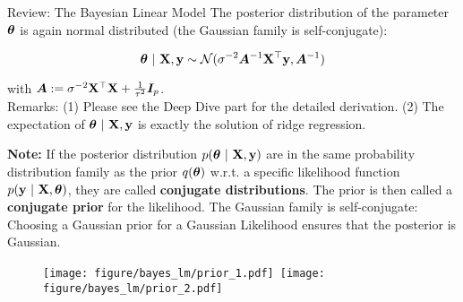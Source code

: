 \documentclass[11pt,compress,t,notes=noshow, xcolor=table]{beamer}
\begin{document}
\begin{vbframe}{Review: The Bayesian Linear Model}
    The posterior distribution of the parameter $\bm{\theta}$ is again normal distributed (the Gaussian family is self-conjugate): 

    $$
    \bm{\theta} ~|~ \mathbf{X}, \mathbf{y} \sim \mathcal{N}(\sigma^{-2}\bm{A}^{-1}\mathbf{X}^\top\mathbf{y}, \bm{A}^{-1})
    $$

    with $\bm{A}:= \sigma^{-2}\mathbf{X}^\top\mathbf{X} + \frac{1}{\tau^2} \bm{I}_p$. \\
    
    Remarks: (1) Please see the Deep Dive part for the detailed derivation. (2) The expectation of $\bm{\theta} ~|~ \mathbf{X}, \mathbf{y}$ is exactly the solution of ridge regression.

    \lz 

    \begin{footnotesize}
    \textbf{Note:} If the posterior distribution $p(\bm{\theta}~|~\mathbf{X}, \mathbf{y})$ are in the same probability distribution family as the prior $q(\bm{\theta})$ w.r.t. a specific likelihood function $p(\mathbf{y}~|~\mathbf{X}, \bm{\theta})$, they are called \textbf{conjugate distributions}. The prior is then called a \textbf{conjugate prior} for the likelihood. The Gaussian family is self-conjugate: Choosing a Gaussian prior for a Gaussian Likelihood ensures that the posterior is Gaussian. 
    \end{footnotesize}

    \framebreak 
    
    \begin{figure}
      \texttt{[image: figure/bayes\_lm/prior\_1.pdf]}~\texttt{[image: figure/bayes\_lm/prior\_2.pdf]}
    \end{figure}

\end{vbframe}
    
    
\end{document}
